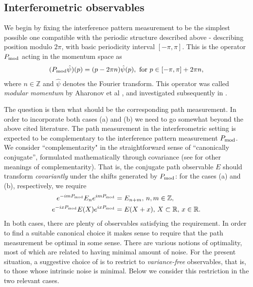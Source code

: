 \subsection{Interferometric observables}

We begin by fixing the interference pattern measurement to be the simplest possible one compatible with the periodic structure described above - describing position modulo $2\pi$, with basic periodicity interval $[-\pi,\pi]$. This is the operator $P_{\mathrm{mod}}$ acting in the momentum space as
\begin{align}
(P_{\mathrm{mod}}\hat\psi)(p) = (p-2\pi n)\hat\psi(p), \text{ for } p\in [-\pi,\pi] +2\pi n,
\end{align}
where $n\in \mathbb Z$ and $\hat \psi$ denotes the Fourier transform. This operator was called \emph{modular momentum} by Aharonov et al \cite{aharonov-modular-variables}, and investigated subsequently in \cite{PhysRevA.90.022115}.

The question is then what should be the corresponding path measurement. In order to incorporate both cases (a) and (b) we need to go somewhat beyond the above cited literature. The path measurement in the interferometric setting is expected to be complementary to the interference pattern measurement $P_{\mathrm{mod}}$. We consider ``complementarity" in the straightforward sense of ``canonically conjugate'', formulated mathematically through covariance (see \cite{}  for other meanings of complementarity). That is, the conjugate path observable $E$ should transform \emph{covariantly} under the shifts generated by $P_{\mathrm{mod}}$: for the cases (a) and (b), respectively, we require
\begin{align}
e^{-im P_{\mathrm{mod}}}E_ne^{im P_{\mathrm{mod}}} &= E_{n+m}, \,n,m\in \mathbb Z, \label{covA}\\
e^{-ix P_{\mathrm{mod}}}E(X)e^{ix P_{\mathrm{mod}}} &= E(X+x), \,X\subset \mathbb R,\,x\in \mathbb R. \label{covB}
\end{align}
In both cases, there are plenty of observables satisfying the requirement. In order to find a suitable canonical choice it makes sense to require that the path measurement be optimal in some sense. There are various notions of optimality, most of which are related to having minimal amount of noise. For the present situation, a suggestive choice of is to restrict to \emph{variance-free} observables, that is, to those whose intrinsic noise is minimal. Below we consider this restriction in the two relevant cases.

